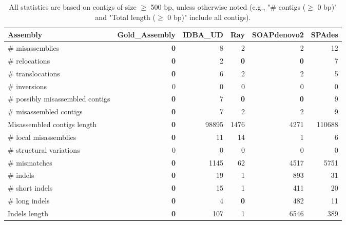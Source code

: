 \documentclass[12pt,a4paper]{article}
\begin{document}
\begin{table}[ht]
\begin{center}
\caption{All statistics are based on contigs of size $\geq$ 500 bp, unless otherwise noted (e.g., "\# contigs ($\geq$ 0 bp)" and "Total length ($\geq$ 0 bp)" include all contigs).}
\begin{tabular}{|l*{5}{|r}|}
\hline
Assembly & Gold\_Assembly & IDBA\_UD & Ray & SOAPdenovo2 & SPAdes \\ \hline
\# misassemblies & {\bf 0} & 8 & 2 & 2 & 12 \\ \hline
\hspace{5mm}\# relocations & {\bf 0} & 2 & {\bf 0} & {\bf 0} & 7 \\ \hline
\hspace{5mm}\# translocations & {\bf 0} & 6 & 2 & 2 & 5 \\ \hline
\hspace{5mm}\# inversions & 0 & 0 & 0 & 0 & 0 \\ \hline
\# possibly misassembled contigs & {\bf 0} & 7 & {\bf 0} & {\bf 0} & 9 \\ \hline
\# misassembled contigs & {\bf 0} & 7 & 2 & 2 & 9 \\ \hline
Misassembled contigs length & {\bf 0} & 98895 & 1476 & 4271 & 110688 \\ \hline
\# local misassemblies & {\bf 0} & 11 & 14 & 1 & 6 \\ \hline
\# structural variations & 0 & 0 & 0 & 0 & 0 \\ \hline
\# mismatches & {\bf 0} & 1145 & 62 & 4517 & 5751 \\ \hline
\# indels & {\bf 0} & 19 & 1 & 893 & 31 \\ \hline
\hspace{5mm}\# short indels & {\bf 0} & 15 & 1 & 411 & 20 \\ \hline
\hspace{5mm}\# long indels & {\bf 0} & 4 & {\bf 0} & 482 & 11 \\ \hline
Indels length & {\bf 0} & 107 & 1 & 6546 & 389 \\ \hline
\end{tabular}
\end{center}
\end{table}
\end{document}
